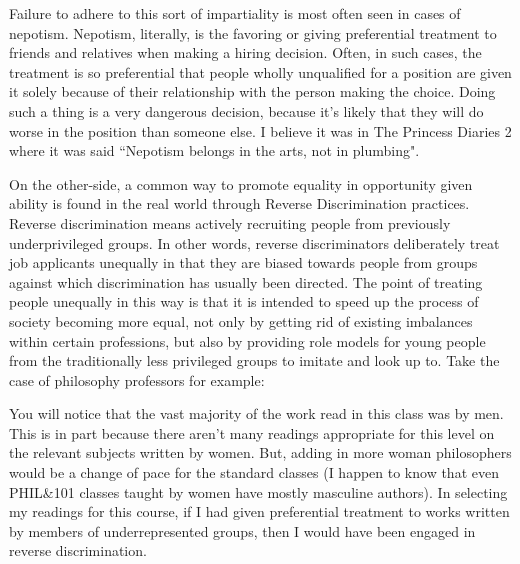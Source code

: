 Failure to adhere to this sort of impartiality is most often seen in cases of nepotism. Nepotism, literally, is the favoring or giving preferential treatment to friends and relatives when making a hiring decision. Often, in such cases, the treatment is so preferential that people wholly unqualified for a position are given it solely because of their relationship with the person making the choice.  Doing such a thing is a very dangerous decision, because it's likely that they will do worse in the position than someone else. I believe it was in The Princess Diaries 2 where it was said ``Nepotism belongs in the arts, not in plumbing". 

On the other-side, a common way to promote equality in opportunity given ability is found in the real world through Reverse Discrimination practices. Reverse discrimination means actively recruiting people from previously underprivileged groups. In other words, reverse discriminators deliberately treat job applicants unequally in that they are biased towards people from groups against which discrimination has usually been directed. The point of treating people unequally in this way is that it is intended to speed up the process of society becoming more equal, not only by getting rid of existing imbalances within certain professions, but also by providing role models for young people from the traditionally less privileged groups to imitate and look up to. Take the case of philosophy professors for example:


You will notice that the vast majority of the work read in this class was by men. This is in part because there aren't many readings appropriate for this level on the relevant subjects written by women. But, adding in more woman philosophers would be a change of pace for the standard classes (I happen to know that even PHIL\&101 classes taught by women have mostly masculine authors). In selecting my readings for this course, if I had given preferential treatment to works written by members of underrepresented groups, then I would have been engaged in reverse discrimination.

